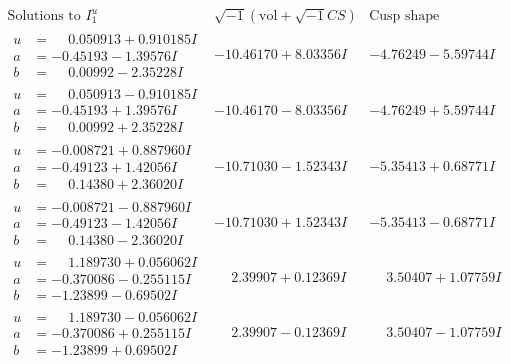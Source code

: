 \documentclass[1p]{elsarticle_modified}
\theoremstyle{definition}
\newcommand{\I}{\sqrt{-1}}
\begin{document}
$$\begin{array}{c|c|c}  
\text{Solutions to }I^u_{1}& \I (\text{vol} + \sqrt{-1}CS) & \text{Cusp shape}\\
 \hline 
\begin{aligned}
u &= \phantom{-}0.050913 + 0.910185 I \\
a &= -0.45193 - 1.39576 I \\
b &= \phantom{-}0.00992 - 2.35228 I\end{aligned}
 & -10.46170 + 8.03356 I & -4.76249 - 5.59744 I \\ \hline\begin{aligned}
u &= \phantom{-}0.050913 - 0.910185 I \\
a &= -0.45193 + 1.39576 I \\
b &= \phantom{-}0.00992 + 2.35228 I\end{aligned}
 & -10.46170 - 8.03356 I & -4.76249 + 5.59744 I \\ \hline\begin{aligned}
u &= -0.008721 + 0.887960 I \\
a &= -0.49123 + 1.42056 I \\
b &= \phantom{-}0.14380 + 2.36020 I\end{aligned}
 & -10.71030 - 1.52343 I & -5.35413 + 0.68771 I \\ \hline\begin{aligned}
u &= -0.008721 - 0.887960 I \\
a &= -0.49123 - 1.42056 I \\
b &= \phantom{-}0.14380 - 2.36020 I\end{aligned}
 & -10.71030 + 1.52343 I & -5.35413 - 0.68771 I \\ \hline\begin{aligned}
u &= \phantom{-}1.189730 + 0.056062 I \\
a &= -0.370086 - 0.255115 I \\
b &= -1.23899 - 0.69502 I\end{aligned}
 & \phantom{-}2.39907 + 0.12369 I & \phantom{-}3.50407 + 1.07759 I \\ \hline\begin{aligned}
u &= \phantom{-}1.189730 - 0.056062 I \\
a &= -0.370086 + 0.255115 I \\
b &= -1.23899 + 0.69502 I\end{aligned}
 & \phantom{-}2.39907 - 0.12369 I & \phantom{-}3.50407 - 1.07759 I \\ \hline\begin{aligned}

\end{aligned}
\end{array}$$
\end{document}
